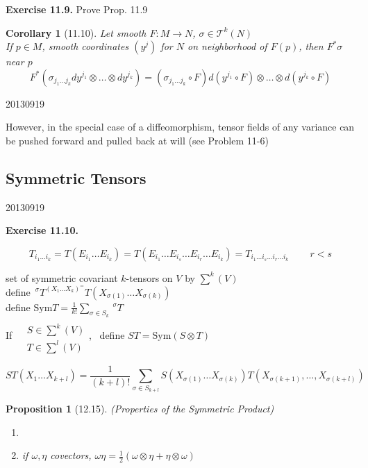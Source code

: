 \documentclass[11pt]{amsart}
\newtheorem{proposition}{Proposition}
\newtheorem{corollary}{Corollary}
\theoremstyle{definition}
\newcommand{\exercisehead}[1]{\medskip\noindent\textbf{Exercise #1.} }
\begin{document}
\exercisehead{11.9} Prove Prop. 11.9

\begin{corollary}[11.10] Let smooth $F:M \to N$, $\sigma \in \mathcal{T}^k(N)$ \\
If $p\in M$, smooth coordinates $(y^j)$ for $N$ on neighborhood of $F(p)$, then $F^*\sigma$ near $p$
\[
F^*(\sigma_{j_1 \dots j_k} dy^{j_1} \otimes \dots \otimes dy^{j_k} ) = (\sigma_{j_1 \dots j_k } \circ F ) d(y^{j_1 } \circ F) \otimes \dots \otimes d(y^{j_k} \circ F)
\]
\end{corollary}


20130919

However, in the special case of a diffeomorphism, tensor fields of any variance can be pushed forward and pulled back at will (see Problem 11-6)

\subsection*{Symmetric Tensors}

20130919

\exercisehead{11.10}

\[
T_{i_1 \dots i_k} = T(E_{i_1} \dots E_{i_k} ) = T(E_{i_1} \dots E_{i_s} \dots E_{i_r} \dots E_{i_k} ) = T_{i_1 \dots i_s \dots i_r \dots i_k } \quad \quad \, r<s
\]


set of symmetric covariant $k$-tensors on $V$ by $\sum^k(V)$ \\

define $\,^{\sigma}T^(X_1 \dots X_k)^ = T(X_{\sigma(1)} \dots X_{ \sigma(k)})$ \\

define $\text{Sym}T = \frac{1}{k!}  \sum_{\sigma \in S_k} \,^{\sigma}T$ \\

If $\begin{aligned} & \quad \\
  & S \in \sum^k(V) \\
  & T\in \sum^l(V) \end{aligned}$, \, define $ST = \text{Sym}{ (S\otimes T)}$

\[
ST(X_1 \dots X_{k+l}) = \frac{1}{ (k+l)!} \sum_{ \sigma \in S_{k+l} } S(X_{\sigma(1)} \dots X_{\sigma(k)} ) T(X_{\sigma(k+1)}, \dots , X_{\sigma(k+l) } )
\]

\begin{proposition}[12.15] (Properties of the Symmetric Product)
\begin{enumerate}
\item[(a)]
\item[(b)] if $\omega, \eta$ covectors, $ \omega \eta = \frac{1}{2} ( \omega \otimes \eta + \eta \otimes \omega)$
\end{enumerate}
\end{proposition}
\end{document}
